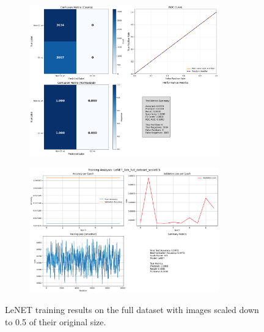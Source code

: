 \documentclass{pracalicmgr}
\begin{document}
\newpage

\begin{figure}[H]
    \centering
    \begin{subfigure}{\textwidth}
        \centering
        \includegraphics[width=0.9\textwidth]{src/LeNET_1ch_full_dataset_scale05.png}
        \label{fig:Lefull5sub1}
    \end{subfigure}
    
    \vspace{1cm}
    
    \begin{subfigure}{\textwidth}
        \centering
        \includegraphics[width=0.9\textwidth]{src/LeNET_1ch_full_dataset_scale05loss.png}
        \label{fig:Lefull5sub2}
    \end{subfigure}
    \caption{LeNET training results on the full dataset with images scaled down to 0.5 of their original size.}
    \label{fig:Lefull5stacked}
\end{figure}
\end{document}
